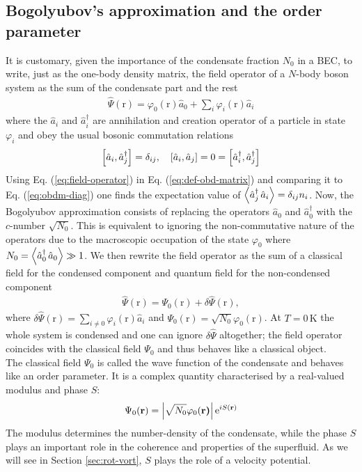 \documentclass[11pt,a4paper,twoside]{article}
\renewcommand{\vec}[1]{\bm{\mathrm{#1}}}
\newcommand{\unit}[1]{\,\mathrm{#1}}
\begin{document}
		\subsection{Bogolyubov's approximation and the order parameter}
			It is customary, given the importance of the condensate fraction $N_0$ in a BEC, to write, just as the one-body density matrix, the field operator of a $N$-body boson system as the sum of the condensate part and the rest
			\begin{align}
				\hat{\Psi}(\vec{r})=\varphi_0(\vec{r})\hat{a}_0 + \sum_i \varphi_i(\vec{r})\hat{a}_i \label{eq:field-operator}
			\end{align}
			where the $\hat{a}_i$ and $\hat{a}_i^\dagger$ are annihilation and creation operator of a particle in state $\varphi_i$ and obey the usual bosonic commutation relations
			\begin{align}
				\commutator{\hat{a}_i}{\hat{a}_j^\dagger}=\delta_{ij},\quad 	\commutator{\hat{a}_i}{\hat{a}_j}=0=\commutator{\hat{a}_i^\dagger}{\hat{a}_j^\dagger}
			\end{align}
			Using Eq. (\ref{eq:field-operator}) in Eq. (\ref{eq:def-obd-matrix}) and comparing it to Eq. (\ref{eq:obdm-diag}) one finds the expectation value of $\expectationvalue{\hat{a}_j^\dagger\,\hat{a}_i}=\delta_{ij}n_i$. Now, the Bogolyubov approximation consists of replacing the operators $\hat{a}_0$ and $\hat{a}_0^\dagger$ with the $c$-number $\sqrt{N_0}$. This is equivalent to ignoring the non-commutative nature of the operators due to the macroscopic occupation of the state $\varphi_0$ where $N_0=\expectationvalue{\hat{a}_0^\dagger\,\hat{a}_0}\gg 1$. We then rewrite the field operator as the sum of a classical field for the condensed component and quantum field for the non-condensed component
			\begin{align}
				\hat{\Psi}(\vec{r})=\Psi_0(\vec{r})+\delta\hat{\Psi}(\vec{r}),
			\end{align}
			where $\delta\hat{\Psi}(\vec{r})=\sum_{i\neq 0}\varphi_i(\vec{r})\hat{a}_i$ and $\Psi_0(\vec{r})=\sqrt{N_0}\varphi_0(\vec{r})$. At $T=0\unit{K}$ the whole system is condensed and one can ignore $\delta\hat{\Psi}$ altogether; the field operator coincides with the classical field $\Psi_0$ and thus behaves like a classical object.\\
			
			The classical field $\Psi_0$ is called the wave function of the condensate and behaves like an order parameter. It is a complex quantity characterised by a real-valued modulus and phase $S$:
			\begin{align}
				\Psi_0(\vec{r}) = \absolutevalue{\sqrt{N_0}\varphi_0(\vec{r)}}\,\mathrm{e}^{iS(\vec{r})}\label{eq:order-parameter}
			\end{align}
			The modulus determines the number-density of the condensate, while the phase $S$ plays an important role in the coherence and properties of the superfluid. As we will see in Section \ref{sec:rot-vort}, $S$ plays the role of a velocity potential.\\
			
\end{document}
